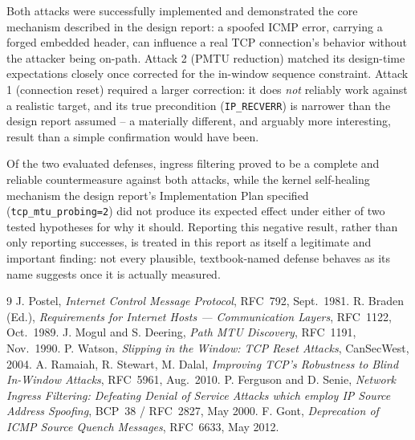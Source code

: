 \documentclass[11pt]{article}
\begin{document}
Both attacks were successfully implemented and demonstrated the core
mechanism described in the design report: a spoofed ICMP error,
carrying a forged embedded header, can influence a real TCP connection's
behavior without the attacker being on-path. Attack 2 (PMTU reduction)
matched its design-time expectations closely once corrected for the
in-window sequence constraint. Attack 1 (connection reset) required a
larger correction: it does \emph{not} reliably work against a realistic
target, and its true precondition (\texttt{IP\_RECVERR}) is narrower
than the design report assumed -- a materially different, and arguably
more interesting, result than a simple confirmation would have been.

Of the two evaluated defenses, ingress filtering proved to be a
complete and reliable countermeasure against both attacks, while the
kernel self-healing mechanism the design report's Implementation Plan
specified (\texttt{tcp\_mtu\_probing=2}) did not produce its expected
effect under either of two tested hypotheses for why it should.
Reporting this negative result, rather than only reporting successes,
is treated in this report as itself a legitimate and important finding:
not every plausible, textbook-named defense behaves as its name
suggests once it is actually measured.

\begin{thebibliography}{9}
 J. Postel, \emph{Internet Control Message Protocol}, RFC~792, Sept.\ 1981.
 R. Braden (Ed.), \emph{Requirements for Internet Hosts --- Communication Layers}, RFC~1122, Oct.\ 1989.
 J. Mogul and S. Deering, \emph{Path MTU Discovery}, RFC~1191, Nov.\ 1990.
 P. Watson, \emph{Slipping in the Window: TCP Reset Attacks}, CanSecWest, 2004.
 A. Ramaiah, R. Stewart, M. Dalal, \emph{Improving TCP's Robustness to Blind In-Window Attacks}, RFC~5961, Aug.\ 2010.
 P. Ferguson and D. Senie, \emph{Network Ingress Filtering: Defeating Denial of Service Attacks which employ IP Source Address Spoofing}, BCP~38 / RFC~2827, May 2000.
 F. Gont, \emph{Deprecation of ICMP Source Quench Messages}, RFC~6633, May 2012.
\end{thebibliography}
\end{document}
